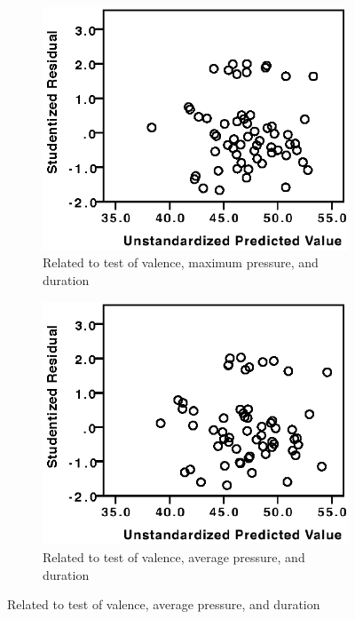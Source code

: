 \begin{figure}[h]
\centering
\begin{subfigure}[b]{0.45\textwidth}
    \centering
    \includegraphics[width=\textwidth]{images/linearity/ValMax.eps}
    \caption{Related to test of valence, maximum pressure, and duration}
    \label{fig:valence_maximum}
\end{subfigure}
\quad
\begin{subfigure}[b]{0.45\textwidth}
    \centering
    \includegraphics[width=\textwidth]{images/linearity/ValAvg.eps}
    \caption{Related to test of valence, average pressure, and duration}

\end{subfigure}
\end{figure}
